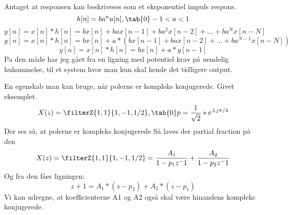 \begin{Udledninger}
    \begin{underrubrik}
        Antaget at responsen kan beskriveses som et eksponentiel impuls respons.
        \[h[n] = ba^nu[n],\tab{0} -1<a<1\]
        \[y[n] = x[n] * h[n] = bx[n] + bax[n-1] + ba^2x[n-2] + ... + ba^Nx[n-N]\]
        \[y[n] = x[n] * h[n] = bx[n] + a*(bx[n-1] + bax[n-2] + ... + ba^{N-1}x[n-N])\]
        \[y[n] = x[n] * h[n] = bx[n] + a*y[n-1]\]
        Pa den måde har jeg gået fra en ligning med potentiel krav på uendelig hukommelse,
        til et system hvor man kun skal kende det tidligere output. 
        \\
    \end{underrubrik}
    \begin{underrubrik}
        En egenskab man kan bruge, når polerne er kompleks konjugerede. 
        Givet eksemplet. 
        \[X(z) = \filterZ{1, 1}{1, -1, 1/2}, \tab{0} p = \frac{1}{\sqrt{2}} * e^{\pm j\pi/4}\]
        Der ses så, at polerne er kompleks konjugerede
        Så laves der partial fraction på den
        \[X(z) = \filterZ{1, 1}{1, -1, 1/2} = \frac{A_1}{1 - p_1z^-1} + \frac{A_2}{1 - p_2z^-1}\]
        Og fra den fåes ligningen: 
        \[z + 1 = A_1 * (z - p_2) + A_2 * (z - p_1)\]
        Vi kan udregne, at koefficienterne A1 og A2 også skal være hinandens kompleks konjugerede.
    

\end{underrubrik}
\end{Udledninger}
